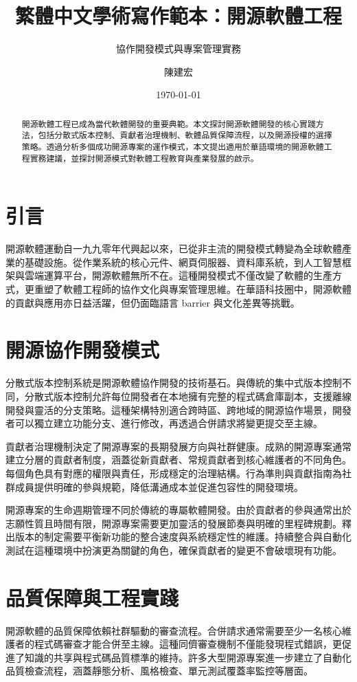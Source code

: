 \documentclass[
    language=traditionalchinese,
    doctype=article,
]{../../omnilatex}
\title{繁體中文學術寫作範本：開源軟體工程}
\subtitle{協作開發模式與專案管理實務}
\author{陳建宏}
\date{\today}
\begin{document}
\maketitle

\begin{abstract}
開源軟體工程已成為當代軟體開發的重要典範。本文探討開源軟體開發的核心實踐方法，包括分散式版本控制、貢獻者治理機制、軟體品質保障流程，以及開源授權的選擇策略。透過分析多個成功開源專案的運作模式，本文提出適用於華語環境的開源軟體工程實務建議，並探討開源模式對軟體工程教育與產業發展的啟示。
\end{abstract}

\section{引言}
開源軟體運動自一九九零年代興起以來，已從非主流的開發模式轉變為全球軟體產業的基礎設施。從作業系統的核心元件、網頁伺服器、資料庫系統，到人工智慧框架與雲端運算平台，開源軟體無所不在。這種開發模式不僅改變了軟體的生產方式，更重塑了軟體工程師的協作文化與專案管理思維。在華語科技圈中，開源軟體的貢獻與應用亦日益活躍，但仍面臨語言 barrier 與文化差異等挑戰。

\section{開源協作開發模式}
分散式版本控制系統是開源軟體協作開發的技術基石。與傳統的集中式版本控制不同，分散式版本控制允許每位開發者在本地擁有完整的程式碼倉庫副本，支援離線開發與靈活的分支策略。這種架構特別適合跨時區、跨地域的開源協作場景，開發者可以獨立建立功能分支、進行修改，再透過合併請求將變更提交至主線。

貢獻者治理機制決定了開源專案的長期發展方向與社群健康。成熟的開源專案通常建立分層的貢獻者制度，涵蓋從新貢獻者、常规貢獻者到核心維護者的不同角色。每個角色具有對應的權限與責任，形成穩定的治理結構。行為準則與貢獻指南為社群成員提供明確的參與規範，降低溝通成本並促進包容性的開發環境。

開源專案的生命週期管理不同於傳統的專屬軟體開發。由於貢獻者的參與通常出於志願性質且時間有限，開源專案需要更加靈活的發展節奏與明確的里程碑規劃。釋出版本的制定需要平衡新功能的整合速度與系統穩定性的維護。持續整合與自動化測試在這種環境中扮演更為關鍵的角色，確保貢獻者的變更不會破壞現有功能。

\section{品質保障與工程實踐}
開源軟體的品質保障依賴社群驅動的審查流程。合併請求通常需要至少一名核心維護者的程式碼審查才能合併至主線。這種同儕審查機制不僅能發現程式錯誤，更促進了知識的共享與程式碼品質標準的維持。許多大型開源專案進一步建立了自動化品質檢查流程，涵蓋靜態分析、風格檢查、單元測試覆蓋率監控等層面。
\end{document}
